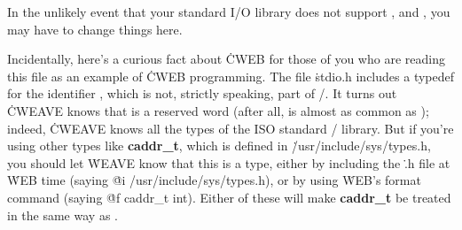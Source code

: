 In the unlikely event that your standard I/O library does not
support ,  and , you may have to
change things here.

Incidentally, here's a curious fact about \.{CWEB} for those of you
who are reading this file as an example of \.{CWEB} programming.
The file \.{stdio.h} includes a typedef for
the identifier , which is not, strictly speaking, part of \CEE/.
It turns out \.{CWEAVE} knows that  is a reserved word (after all,
 is almost as common as ); indeed, \.{CWEAVE} knows
all
the types of the ISO standard \CEE/ library. But
if you're using other types like {\bf caddr\_t},
which is defined in \.{/usr/include/sys/types.h}, you should let
\.{WEAVE} know that this is a type, either by including the \.{.h} file
at \.{WEB} time (saying \.{@i /usr/include/sys/types.h}), or by
using \.{WEB}'s format command (saying \.{@f caddr\_t int}).  Either of
these will make {\bf caddr\_t} be treated in the same way as .

